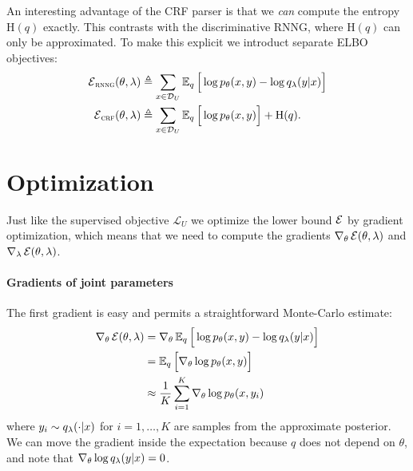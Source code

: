 An interesting advantage of the CRF parser is that we \textit{can} compute the entropy H$(q)$ exactly. This contrasts with the discriminative RNNG, where H$(q)$ can only be approximated. To make this explicit we introduct separate ELBO objectives:
\begin{align}
  \operatorname{\mathcal{E}}_{\textsc{rnng}}(\theta, \lambda) &\triangleq \sum_{x \in \mathcal{D}_U}\operatorname{\mathbb{E}}_{q} \Big[\log p_{\theta}(x,y )  - \log  q_{\lambda}(y | x) \Big] \\
  \operatorname{\mathcal{E}}_{\textsc{crf}}(\theta, \lambda) &\triangleq \sum_{x \in \mathcal{D}_U} \operatorname{\mathbb{E}}_{q} \Big[\log p_{\theta}(x,y ) \Big]  + \text{H}(q).
\end{align}


\section{Optimization}
Just like the supervised objective $\mathcal{L}_U$ we optimize the lower bound $\operatorname{\mathcal{E}}$ by gradient optimization, which means that we need to compute the gradients $\nabla_{\theta} \operatorname{\mathcal{E}}(\theta, \lambda)$ and $\nabla_{\lambda} \operatorname{\mathcal{E}}(\theta, \lambda)$.

\paragraph{Gradients of joint parameters} The first gradient is easy and permits a straightforward Monte-Carlo estimate:
\begin{align*}
  \nabla_{\theta} \operatorname{\mathcal{E}}(\theta, \lambda)
    &= \nabla_{\theta} \operatorname{\mathbb{E}}_{q} \Big[\log p_{\theta}(x, y)  - \log q_{\lambda}(y | x) \Big] \\
    &= \operatorname{\mathbb{E}}_{q} \Big[ \nabla_{\theta} \log p_{\theta}(x, y) \Big] \\
    &\approx \frac{1}{K}\sum_{i=1}^K  \nabla_{\theta} \log p_{\theta}(x, y_{i})
\end{align*}
where $y_i \sim q_{\lambda}( \cdot | x)$ for $i=1,\dots,K$ are samples from the approximate posterior. We can move the gradient inside the expectation because $q$ does not depend on $\theta$, and note that $\nabla_{\theta} \log q_{\lambda}(y | x) = 0$.

